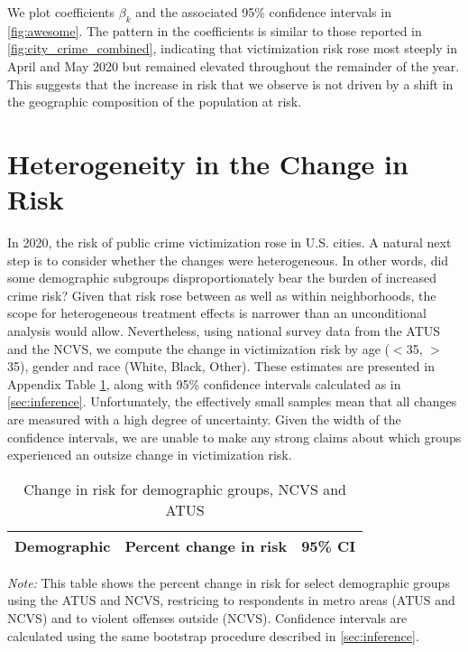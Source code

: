 We plot coefficients $\beta_k$ and the associated 95\% confidence intervals in \autoref{fig:awesome}. The pattern in the coefficients is similar to those reported in \autoref{fig:city_crime_combined}, indicating that victimization risk rose most steeply in April and May 2020 but remained elevated throughout the remainder of the year. This suggests that the increase in risk that we observe is not driven by a shift in the geographic composition of the population at risk. 



\newpage
\clearpage
\section{Heterogeneity in the Change in Risk} \label{sec:heterogeneity}
In 2020, the risk of public crime victimization rose in U.S. cities. A natural next step is to consider whether the changes were heterogeneous. In other words, did some demographic subgroups disproportionately bear the burden of increased crime risk? Given that risk rose between as well as within neighborhoods, the scope for heterogeneous treatment effects is narrower than an unconditional analysis would allow. Nevertheless, using national survey data from the ATUS and the NCVS, we compute the change in victimization risk by age ($<$35, $>$35), gender and race (White, Black, Other). These estimates are presented in Appendix Table \ref{tab:atus_ncvs_demog_table}, along with 95\% confidence intervals calculated as in \autoref{sec:inference}.  Unfortunately, the effectively small samples mean that all changes are measured with a high degree of uncertainty.  Given the width of the confidence intervals, we are unable to make any strong claims about which groups experienced an outsize change in victimization risk.

\clearpage
\begin{table}[]
    \caption{Change in risk for demographic groups, NCVS and ATUS}
    \label{tab:atus_ncvs_demog_table}
    \begin{center}
    \begin{tabular}{lcc}
    Demographic & Percent change in risk & 95\% CI \\ \hline
    
    \hline 
    \end{tabular}
    \end{center}
    \textit{Note:} This table shows the percent change in risk for select demographic groups using the ATUS and NCVS, restricing to respondents in metro areas (ATUS and NCVS) and to violent offenses outside (NCVS). Confidence intervals are calculated using the same bootstrap procedure described in \autoref{sec:inference}. 
\end{table}

